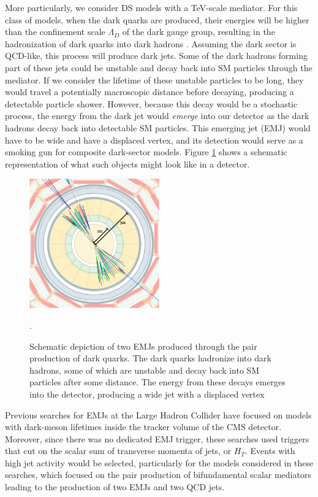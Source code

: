 More particularly, we consider DS models with a TeV-scale mediator. For this class of models, when the dark quarks are produced, their energies will be higher than the confinement scale $\Lambda_D$ of the dark gauge group, resulting in the hadronization of dark quarks into dark hadrons \cite{schwallerEmergingJets2015, albouyTheoryPhenomenologyExperimental2022}. Assuming the dark sector is QCD-like, this process will produce dark jets. Some of the dark hadrons forming part of these jets could be unstable and decay back into SM particles through the mediator. If we consider the lifetime of these unstable particles to be long, they would travel a potentially macroscopic distance before decaying, producing a detectable particle shower. However, because this decay would be a stochastic process, the energy from the dark jet would \textit{emerge} into our detector as the dark hadrons decay back into detectable SM particles. This emerging jet (EMJ) would have to be wide and have a displaced vertex, and its detection would serve as a smoking gun for composite dark-sector models\cite{schwallerEmergingJets2015}. Figure \ref{fig:emj} shows a schematic representation of what such objects might look like in a detector.

\begin{figure}[ht]
	\centering
	\includegraphics[width=0.5\textwidth]{images/emj.png}
	\caption{Schematic depiction of two EMJs produced through the pair production of dark quarks. The dark quarks hadronize into dark hadrons, some of which are unstable and decay back into SM particles after some distance. The energy from these decays emerges into the detector, producing a wide jet with a displaced vertex \cite{schwallerEmergingJets2015}}.
	\label{fig:emj}
\end{figure}

Previous searches for EMJs at the Large Hadron Collider have focused on models with dark-meson lifetimes inside the tracker volume of the CMS detector\cite{}. Moreover, since there was no dedicated EMJ trigger, these searches used triggers that cut on the scalar sum of transverse momenta of jets, or $H_T$. Events with high jet activity would be selected, particularly for the models considered in these searches, which focused on the pair production of bifundamental scalar mediators leading to the production of two EMJs and two QCD jets.

